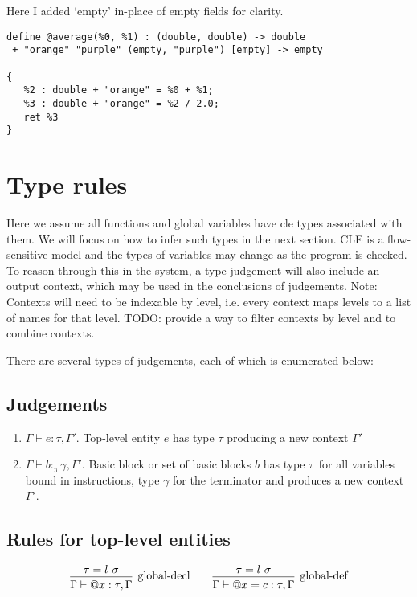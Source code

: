 \documentclass{article}
\begin{document}
Here I added `empty' in-place of empty fields for clarity. 
\begin{verbatim}
define @average(%0, %1) : (double, double) -> double
 + "orange" "purple" (empty, "purple") [empty] -> empty
      
{
   %2 : double + "orange" = %0 + %1;
   %3 : double + "orange" = %2 / 2.0;
   ret %3
}
\end{verbatim}

\section{Type rules}
Here we assume all functions and global variables have cle types associated with them.  We will focus on how to infer such types in the next section.
CLE is a flow-sensitive model and the types of variables may change as the program is checked.
To reason through this in the system, a type judgement will also include an output context, which may be used in the conclusions of judgements.
Note: Contexts will need to be indexable by level, i.e. every context maps levels to a list of names for that level.
TODO: provide a way to filter contexts by level and to combine contexts.

There are several types of judgements, each of which is enumerated below:

\subsection{Judgements}
\begin{enumerate}
    \item $\Gamma \vdash e : \tau, \Gamma'$. Top-level entity $e$ has type $\tau$ producing a new context $\Gamma'$
    \item $\Gamma \vdash b :_\pi \gamma, \Gamma'$. Basic block or set of basic blocks $b$ has type $\pi$ for all variables bound in instructions, type $\gamma$ for the terminator and produces a new context $\Gamma'$.
\end{enumerate}

\subsection{Rules for top-level entities}

\[    
\begin{prooftree}
    \hypo{\tau = l\ \sigma}
    \infer1[global-decl]{\Gamma \vdash @x : \tau, \Gamma}
\end{prooftree}
\qquad
\begin{prooftree}
    \hypo{\tau = l\ \sigma}
    \infer1[global-def]{\Gamma \vdash @x = c : \tau, \Gamma}
\end{prooftree}
\]
\end{document}
